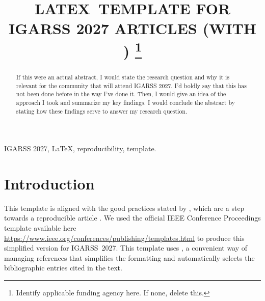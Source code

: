 \documentclass[conference,a4paper]{IEEEtran}
\begin{document}
\title{\uppercase{\LaTeX\ Template for IGARSS 2027 Articles (with \BibTeX)}
\thanks{Identify applicable funding agency here. If none, delete this.}
}

\author{	
	\and
	\and
}


\maketitle
\begin{abstract}
	If this were an actual abstract, I would state the research question and why it is relevant for the community that will attend IGARSS 2027. I'd boldly say that this has not been done before in the way I've done it. Then, I would give an idea of the approach I took and summarize my key findings. I would conclude the abstract by stating how these findings serve to answer my research question.
\end{abstract}

\begin{IEEEkeywords}
	IGARSS 2027, \LaTeX, reproducibility, template.
\end{IEEEkeywords}

\section{Introduction}

This template is aligned with the good practices stated by \citet{EditorialGRSL2015}, which are a step towards a reproducible article \citep{ABadgingSystemforReproducibilityandReplicabilityinRemoteSensingResearch}.
We used the official IEEE Conference Proceedings template available here \url{https://www.ieee.org/conferences/publishing/templates.html} to produce this simplified version for IGARSS~2027.
This template uses \BibTeX, a convenient way of managing references that simplifies the formatting and automatically selects the bibliographic entries cited in the text.
\end{document}
